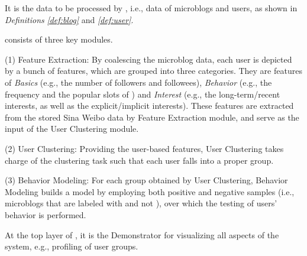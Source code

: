  It is the data to be processed by \sys{}, i.e., data of microblogs and users, as shown in \textit{Definitions} \textit{\ref{def:blog}} and \textit{\ref{def:user}}.

\sys{} consists of three key modules.

	\stab(1)  Feature Extraction: By coalescing the microblog data, each user is depicted by a bunch of features, which are grouped into three categories. They are features of \textit{Basics} (e.g., the number of followers and followees), \textit{Behavior} (e.g., the frequency and the popular slots of \retg{}) and \textit{Interest} (e.g., the long-term/recent interests, as well as the explicit/implicit interests). These features are extracted from the stored  Sina Weibo data by Feature Extraction module, and serve as the input of the User Clustering module.
	
	\stab(2)  User Clustering: Providing the user-based features, User Clustering takes charge of the clustering task such that each user falls into a proper group.
	
	\stab(3)  Behavior Modeling: For each group obtained by User Clustering, Behavior Modeling builds a  model by employing both positive and negative samples (i.e., microblogs that are labeled with \retd{} and not \retd{}), over which the testing of users' \retg{} behavior is performed.
	
 At the top layer of \sys{}, it is the Demonstrator for visualizing all aspects of the system, e.g., profiling of user groups.


